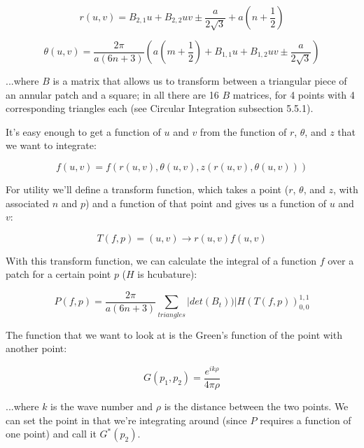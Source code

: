 \documentclass[etd,oneside,senior]{BYUPhys}
\begin{document}
\begin{equation}
  r\left(u,v\right)=B_{2,1}u+B_{2,2}uv\pm\frac{a}{2\sqrt{3}}+a\left(n+\frac{1}{2}\right)
\end{equation}

\begin{equation}
  \theta\left(u,v\right)=\frac{2\pi}{a(6n+3)}\left(a\left(m+\frac{1}{2}\right)+B_{1,1}u+B_{1,2}uv\pm\frac{a}{2\sqrt{3}}\right)
\end{equation}

...where $B$ is a matrix that allows us to transform between a triangular
piece of an annular patch and a square; in all there are 16 $B$ matrices,
for 4 points with 4 corresponding triangles each (see Circular Integration
subsection 5.5.1).

It's easy enough to get a function of $u$ and $v$ from the function
of $r$, $\theta$, and $z$ that we want to integrate:

\begin{equation}
  f\left(u,v\right)=f\left(r\left(u,v\right),\theta\left(u,v\right),z\left(r\left(u,v\right),\theta\left(u,v\right)\right)\right)
\end{equation}

For utility we'll define a transform function, which takes a point
($r$, $\theta$, and $z$, with associated $n$ and $p$) and a function
of that point and gives us a function of $u$ and $v$:

\begin{equation}
  T\left(f,p\right)=\left(u,v\right)\rightarrow r\left(u,v\right)f\left(u,v\right)
\end{equation}

With this transform function, we can calculate the integral of a function
$f$ over a patch for a certain point $p$ ($H$ is hcubature):

\begin{equation}
  P\left(f,p\right)=\frac{2\pi}{a\left(6n+3\right)}\sum_{triangles}|det\left(B_{t}\right))|H\left(T\left(f,p\right)\right)_{0,0}^{1,1}
\end{equation}

The function that we want to look at is the Green's function of the
point with another point:

\begin{equation}
  G\left(p_{1},p_{2}\right)=\frac{e^{ik\rho}}{4\pi\rho}
\end{equation}

...where $k$ is the wave number and $\rho$ is the distance between
the two points. We can set the point in that we're integrating around
(since $P$ requires a function of one point) and call it $G^{*}\left(p_{2}\right)$.
\end{document}
